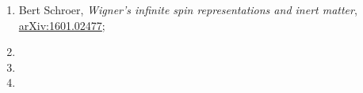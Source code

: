 \documentclass[a4paper,11pt]{article}
\begin{document}
\begin{enumerate}
\item Bert Schroer, \textit{Wigner's infinite spin representations and
    inert matter},
  \href{https://arxiv.org/abs/1601.02477}{arXiv:1601.02477};

\item

\item

\item







































































































\end{enumerate}
\end{document}

